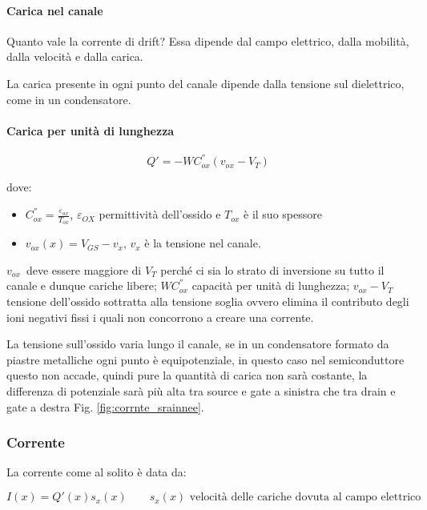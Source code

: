 \paragraph{Carica nel canale}
Quanto vale la corrente di drift? Essa dipende dal campo elettrico, dalla mobilità, dalla velocità e dalla carica.

La	carica	presente	in	ogni	punto	del	canale	dipende	dalla	
tensione	sul	dielettrico,	come	in	un	condensatore.

\paragraph{Carica per unità di lunghezza}

\begin{equation}
    Q' = -WC_{ox}^{''}(v_{ox}-V_T)
\end{equation}

dove:

\begin{itemize}
    \item $C_{ox}^{''} = \frac{\varepsilon_{ox}}{T_{ox}}$, $\varepsilon_{OX}$ permittività dell'ossido e $T_{ox}$ è il suo spessore
    \item $v_{ox}(x) = V_{GS}-v_x$, $v_x$ è la tensione nel canale.
\end{itemize}

$v_{ox}\,$ deve	essere	maggiore di $V_T$ perché ci sia lo strato di inversione su tutto il canale e dunque cariche libere; $WC_{ox}^{''}$ capacità per unità di lunghezza; $v_{ox}-V_T$ tensione dell'ossido sottratta alla tensione soglia ovvero elimina il contributo degli ioni negativi fissi i quali non concorrono a creare una corrente.

La tensione sull'ossido varia lungo il canale, se in un condensatore formato da piastre metalliche ogni punto è equipotenziale, in questo caso nel semiconduttore questo non accade, quindi pure la quantità di carica non sarà costante, la differenza di potenziale sarà più alta tra source e gate a sinistra che tra drain e gate a destra Fig. \ref{fig:corrnte_srainnee}.

\newpage
\subsubsection{Corrente}
La corrente come al solito è data da:

\begin{equation}
    I(x) = Q'(x)s_x(x)\qquad \text{$s_x(x)$ velocità	delle	cariche	dovuta	al	campo	elettrico}
\end{equation}

